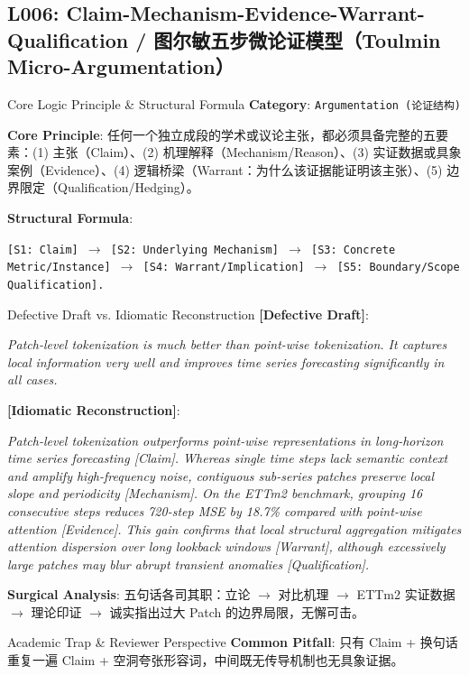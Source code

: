 \subsection{L006: Claim-Mechanism-Evidence-Warrant-Qualification / 图尔敏五步微论证模型（Toulmin Micro-Argumentation）}\label{sec:logic:L006}
\begin{ConceptBox}{Core Logic Principle \& Structural Formula}
\textbf{Category}: \texttt{Argumentation (论证结构)}\par\vspace{3pt}
\textbf{Core Principle}: 任何一个独立成段的学术或议论主张，都必须具备完整的五要素：(1)  主张（Claim）、(2)  机理解释（Mechanism/Reason）、(3)  实证数据或具象案例（Evidence）、(4)  逻辑桥梁（Warrant：为什么该证据能证明该主张）、(5)  边界限定（Qualification/Hedging）。\par\vspace{4pt}
\textbf{Structural Formula}:\par\noindent\texttt{[S1: Claim] $\to$ [S2: Underlying Mechanism] $\to$ [S3: Concrete Metric/Instance] $\to$ [S4: Warrant/Implication] $\to$ [S5: Boundary/Scope Qualification].}
\end{ConceptBox}
\begin{ExampleBox}{Defective Draft vs. Idiomatic Reconstruction}
\textbf{\color{TargetHighlight}[Defective Draft]}:\par\textit{Patch-level tokenization is much better than point-wise tokenization. It captures local information very well and improves time series forecasting significantly in all cases.}\par\vspace{4pt}
\textbf{\color{AcadNavy}[Idiomatic Reconstruction]}:\par\textit{Patch-level tokenization outperforms point-wise representations in long-horizon time series forecasting [Claim]. Whereas single time steps lack semantic context and amplify high-frequency noise, contiguous sub-series patches preserve local slope and periodicity [Mechanism]. On the ETTm2 benchmark, grouping 16 consecutive steps reduces 720-step MSE by 18.7\% compared with point-wise attention [Evidence]. This gain confirms that local structural aggregation mitigates attention dispersion over long lookback windows [Warrant], although excessively large patches may blur abrupt transient anomalies [Qualification].}\par\vspace{4pt}
\textbf{Surgical Analysis}: 五句话各司其职：立论 $\to$ 对比机理 $\to$ ETTm2 实证数据 $\to$ 理论印证 $\to$ 诚实指出过大 Patch 的边界局限，无懈可击。
\end{ExampleBox}
\begin{TipBox}{Academic Trap \& Reviewer Perspective}
\textbf{Common Pitfall}: 只有 Claim + 换句话重复一遍 Claim + 空洞夸张形容词，中间既无传导机制也无具象证据。
\end{TipBox}
\vspace{6pt}
